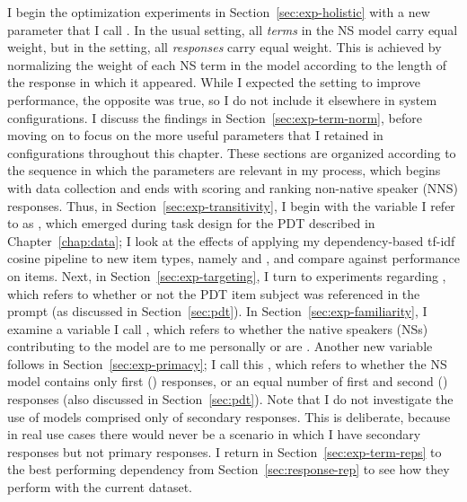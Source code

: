 I begin the optimization experiments in Section~\ref{sec:exp-holistic} with a new parameter that I call . In the usual  setting, all \textit{terms} in the NS model carry equal weight, but in the  setting, all \textit{responses} carry equal weight. This is achieved by normalizing the weight of each NS term in the model according to the length of the response in which it appeared. While I expected the  setting to improve performance, the opposite was true, so I do not include it elsewhere in system configurations. I discuss the findings in Section~\ref{sec:exp-term-norm}, before moving on to focus on the more useful parameters that I retained in configurations throughout this chapter.
These sections are organized according to the sequence in which the parameters are relevant in my process, which begins with data collection and ends with scoring and ranking non-native speaker (NNS) responses. Thus, in Section~\ref{sec:exp-transitivity}, I begin with the variable I refer to as , which emerged during task design for the PDT described in Chapter~\ref{chap:data}; I look at the effects of applying my dependency-based tf-idf cosine pipeline to new item types, namely  and , and compare against performance on  items. Next, in Section~\ref{sec:exp-targeting}, I turn to experiments regarding , which refers to whether or not the PDT item subject was referenced in the prompt (as discussed in Section~\ref{sec:pdt}). In Section~\ref{sec:exp-familiarity}, I examine a variable I call , which refers to whether the native speakers (NSs) contributing to the model are  to me personally or are . Another new variable follows in Section~\ref{sec:exp-primacy}; I call this , which refers to whether the NS model contains only first () responses, or an equal number of first and second () responses (also discussed in Section~\ref{sec:pdt}). Note that I do not investigate the use of models comprised only of secondary responses. This is deliberate, because in real use cases there would never be a scenario in which I have secondary responses but not primary responses. I return in Section~\ref{sec:exp-term-reps} to the best performing dependency  from Section~\ref{sec:response-rep} to see how they perform with the current dataset.

